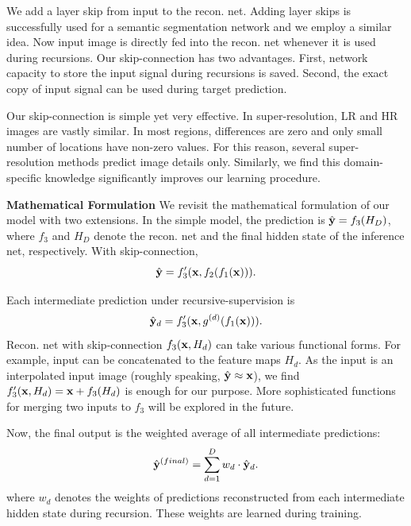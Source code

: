 \documentclass[10pt,twocolumn,letterpaper]{article}
\begin{document}
We add a layer skip \cite{bishop2006pattern} from input to the recon. net. Adding layer skips is successfully used for a semantic segmentation network \cite{long2014fully} and we employ a similar idea. Now input image is directly fed into the recon. net whenever it is used during recursions. Our skip-connection has two advantages. First, network capacity to store the input signal during recursions is saved. Second, the exact copy of input signal can be used during target prediction. 

Our skip-connection is simple yet very effective. In super-resolution, LR and HR images are vastly similar. In most regions, differences are zero and only small number of locations have non-zero values. For this reason, several super-resolution methods \cite{Timofte2013, Timofte, bevilacqua2012,bevilacqua2013super} predict image details only. Similarly, we find this domain-specific knowledge significantly improves our learning procedure. 

\textbf{Mathematical Formulation} We revisit the mathematical formulation of our model with two extensions. In the simple model, the prediction is $\hat{{\bf y}} = f_3(H_D)$, where $f_3$ and $H_D$ denote the recon. net and the final hidden state of the inference net, respectively. With skip-connection,  
\begin{equation}
\hat{{\bf y}} = f_3'({\bf x}, f_2(f_1({\bf x}))).
\end{equation}


Each intermediate prediction under recursive-supervision is 
\begin{equation}
\hat{{\bf y}}_{d} = f_3'({\bf x}, g^{(d)}(f_1({\bf x}))).
\end{equation}
Recon. net with skip-connection $f_3({\bf x}, H_d)$ can take various functional forms. For example, input can be concatenated to the feature maps $H_d$. As the input is an interpolated input image (roughly speaking, $\hat{\bf y} \approx {\bf x}$), we find $f_3'({\bf x}, H_d) = {\bf x} + f_3(H_d)$ is enough for our purpose. More sophisticated functions for merging two inputs to $f_3$ will be explored in the future. 


Now, the final output is the weighted average of all intermediate predictions:
\begin{equation}
\hat{{\bf y}}^{(final)} = \sum_{d=1}^{D} w_d \cdot \hat{{\bf y}}_d.
\end{equation}
where $w_d$ denotes the weights of predictions reconstructed from each intermediate hidden state during recursion. These weights are learned during training.
%
\end{document}
